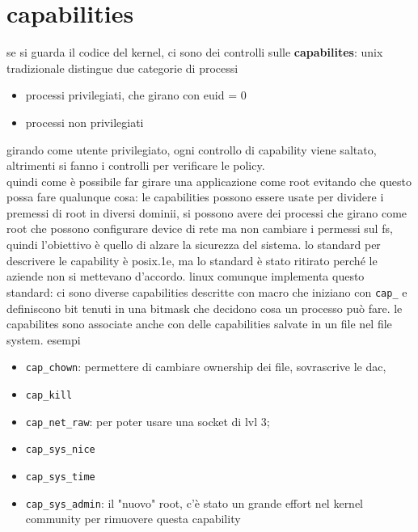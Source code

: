 \documentclass[12pt, oneside]{extbook} %
\begin{document}
\section{capabilities}
se si guarda il codice del kernel, ci sono dei controlli sulle \textbf{capabilites}: unix tradizionale distingue due categorie di processi
\begin{itemize}
\item processi privilegiati, che girano con euid = 0
\item processi non privilegiati
\end{itemize}
girando come utente privilegiato, ogni controllo di capability viene saltato, altrimenti si fanno i controlli per verificare le policy.\\quindi come è possibile far girare una applicazione come root evitando che questo possa fare qualunque cosa: le capabilities possono essere usate per dividere i premessi di root in diversi dominii, si possono avere dei processi che girano come root che possono configurare device di rete ma non cambiare i permessi sul fs, quindi l'obiettivo è quello di alzare la sicurezza del sistema. lo standard per descrivere le capability è posix.1e, ma lo standard è stato ritirato perché le aziende non si mettevano d'accordo. linux comunque implementa questo standard: ci sono diverse capabilities descritte con macro che iniziano con \texttt{cap\_} e definiscono bit tenuti in una bitmask che decidono cosa un processo può fare. le capabilites sono associate anche con delle capabilities salvate in un file nel file system. esempi
\begin{itemize}
\item \texttt{cap\_chown}: permettere di cambiare ownership dei file, sovrascrive le dac,
\item \texttt{cap\_kill}
\item \texttt{cap\_net\_raw}: per poter usare una socket di lvl 3;
\item \texttt{cap\_sys\_nice}
\item \texttt{cap\_sys\_time}
\item \texttt{cap\_sys\_admin}: il "nuovo" root, c'è stato un grande effort nel kernel community per rimuovere questa capability
\end{itemize} 
\end{document}
